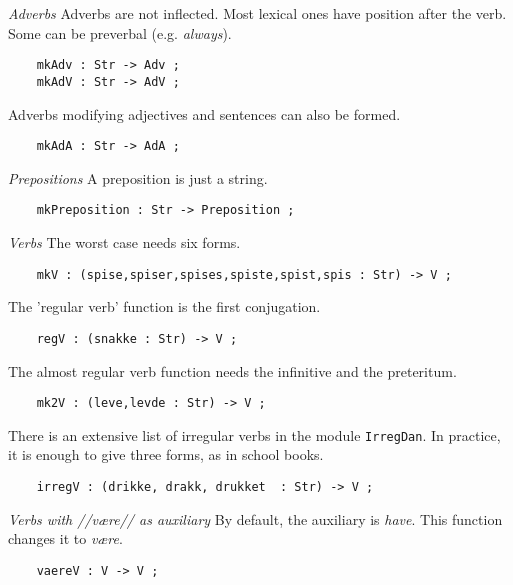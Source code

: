 \documentclass[11pt,a4paper]{article}
\newcommand{\subsubsubsection}[1]{\textit{#1}}
\begin{document}
\subsubsubsection{Adverbs}
Adverbs are not inflected. Most lexical ones have position
after the verb. Some can be preverbal (e.g. \textit{always}).

\begin{verbatim}
    mkAdv : Str -> Adv ;
    mkAdV : Str -> AdV ;
\end{verbatim}

Adverbs modifying adjectives and sentences can also be formed.

\begin{verbatim}
    mkAdA : Str -> AdA ;
\end{verbatim}

\subsubsubsection{Prepositions}
A preposition is just a string.

\begin{verbatim}
    mkPreposition : Str -> Preposition ;
\end{verbatim}

\subsubsubsection{Verbs}
The worst case needs six forms.

\begin{verbatim}
    mkV : (spise,spiser,spises,spiste,spist,spis : Str) -> V ;
\end{verbatim}

The 'regular verb' function is the first conjugation.

\begin{verbatim}
    regV : (snakke : Str) -> V ;
\end{verbatim}

The almost regular verb function needs the infinitive and the preteritum.

\begin{verbatim}
    mk2V : (leve,levde : Str) -> V ;
\end{verbatim}

There is an extensive list of irregular verbs in the module \texttt{IrregDan}.
In practice, it is enough to give three forms, as in school books.

\begin{verbatim}
    irregV : (drikke, drakk, drukket  : Str) -> V ;
\end{verbatim}

\subsubsubsection{Verbs with //være// as auxiliary}
By default, the auxiliary is \textit{have}. This function changes it to \textit{være}.

\begin{verbatim}
    vaereV : V -> V ;
\end{verbatim}
\end{document}
